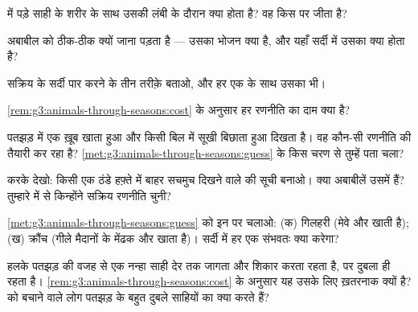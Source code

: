 \begin{exercise}[$\star$]\label{exo:g3:animals-through-seasons:3}
 में पड़े साही के शरीर के साथ उसकी लंबी  के दौरान क्या
होता है? वह किस पर जीता है?
\end{exercise}

\begin{exercise}[$\star$]\label{exo:g3:animals-through-seasons:4}
अबाबील को ठीक-ठीक क्यों जाना पड़ता है --- उसका भोजन क्या है, और यहाँ
सर्दी में उसका क्या होता है?
\end{exercise}

\begin{exercise}[$\star$]\label{exo:g3:animals-through-seasons:5}
सक्रिय  के सर्दी पार करने के तीन तरीक़े बताओ, और हर एक के साथ उसका
 भी।
\end{exercise}

\begin{exercise}[$\star$]\label{exo:g3:animals-through-seasons:6}
\cref{rem:g3:animals-through-seasons:cost} के अनुसार हर रणनीति का दाम
क्या है?
\end{exercise}

\begin{exercise}[$\star$]\label{exo:g3:animals-through-seasons:7}
पतझड़ में एक  ख़ूब खाता हुआ और किसी बिल में सूखी  बिछाता
हुआ दिखता है। वह कौन-सी रणनीति की तैयारी कर रहा है?
\cref{met:g3:animals-through-seasons:guess} के किस चरण से तुम्हें पता
चला?
\end{exercise}

\begin{exercise}[$\star$]\label{exo:g3:animals-through-seasons:8}
करके देखो: किसी एक ठंडे हफ़्ते में बाहर सचमुच दिखने वाले  की
सूची बनाओ। क्या अबाबीलें उसमें हैं? तुम्हारे  में से किन्होंने
सक्रिय रणनीति चुनी?
\end{exercise}

\begin{exercise}[$\star\star$]\label{exo:g3:animals-through-seasons:9}
\cref{met:g3:animals-through-seasons:guess} को इन पर चलाओ: (क) गिलहरी
(मेवे और  खाती है); (ख) क्रौंच (गीले मैदानों के मेंढक और  खाता
है)। सर्दी में हर एक संभवतः क्या करेगा?
\end{exercise}

\begin{exercise}[$\star\star$]\label{exo:g3:animals-through-seasons:10}
हलके पतझड़ की वजह से एक नन्हा साही देर तक जागता और शिकार करता रहता है,
पर दुबला ही रहता है। \cref{rem:g3:animals-through-seasons:cost} के
अनुसार यह उसके लिए ख़तरनाक क्यों है?  को बचाने वाले लोग पतझड़ के
बहुत दुबले साहियों का क्या करते हैं?
\end{exercise}
